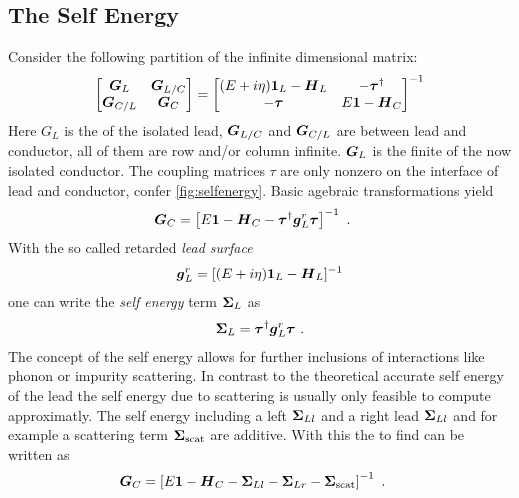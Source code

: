 \subsection{The Self Energy}
Consider the following partition of the infinite dimensional \gfnc{} matrix:
\begin{align}
  \begin{bmatrix}
  \boldsymbol{G}_{L} & \boldsymbol{G}_{L/C}\\
  \boldsymbol{G}_{C/L} & \boldsymbol{G}_{C}
  \end{bmatrix}
  =
  \begin{bmatrix}
  (E+i\eta)\boldsymbol{1}_{L} - \boldsymbol{H}_L  & -\boldsymbol{\tau}^{\dagger} \\
	-\boldsymbol{\tau} & E\boldsymbol{1} - \boldsymbol{H}_C
  \end{bmatrix}^{-1}
  \label{eqn:greendivided}
\end{align}
Here $G_L$ is the \gfnc{} of the isolated lead, $\boldsymbol{G}_{L/C}$ and $\boldsymbol{G}_{C/L}$ are \gfnc{} between lead and conductor, all of them are row and/or column infinite. $\boldsymbol{G}_L$ is the finite \gfnc{} of the now isolated conductor. The coupling matrices $\tau$ are only nonzero on the interface of lead and conductor, confer \cref{fig:selfenergy}.
Basic agebraic transformations yield \cite{Datta1997}
\begin{align}
\boldsymbol{G}_C& = \left[E\boldsymbol{1}-\boldsymbol{H}_C -\boldsymbol{\tau}^{\dagger} \boldsymbol{g}_L^r \boldsymbol{\tau} \right]^{-1} \ .
\label{eqn:finitegreensfunction}
\end{align}
With the so called retarded \emph{lead surface \gfnc{}}
\begin{align}
\boldsymbol{g}_L^r = [(E+i\eta)\boldsymbol{1}_L - \boldsymbol{H}_L]^{-1}
\label{eqn:leadsurfacegfnc}
\end{align}
one can write the \emph{self energy} term $\boldsymbol{\Sigma}_L$ as
\begin{align}
\boldsymbol{\Sigma}_L = \boldsymbol{\tau}^{\dagger} \boldsymbol{g}_L^r \boldsymbol{\tau}\ .
\end{align}
The concept of the self energy allows for further inclusions of interactions like phonon or impurity scattering. In contrast to the theoretical accurate self energy of the lead the self energy due to scattering is usually only feasible to compute approximatly. The self energy including a left $\boldsymbol{\Sigma}_{Ll}$ and a right lead $\boldsymbol{\Sigma}_{Ll}$ and for example a scattering term $\boldsymbol{\Sigma}_{\text{scat}}$ are additive. With this the \gfnc{} to find can be written as
\begin{align}
\boldsymbol{G}_C& = \left[E\boldsymbol{1}-\boldsymbol{H}_C -\boldsymbol{\Sigma}_{Ll}-\boldsymbol{\Sigma}_{Lr}-\boldsymbol{\Sigma}_{\text{scat}} \right]^{-1} \ .
\label{eqn:finitegreensfunctionwithselfenergy}
\end{align}
